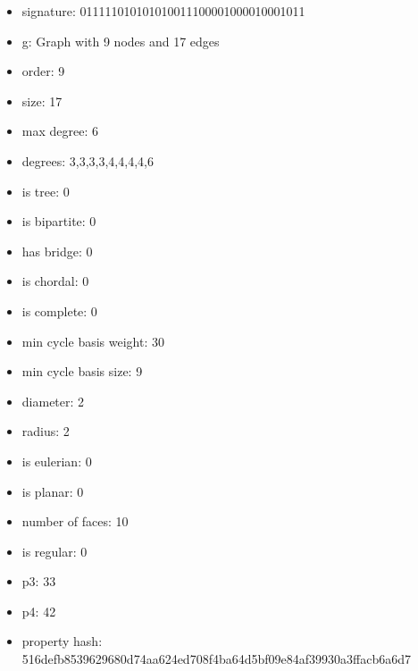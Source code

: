 \newpage
\begin{figure}
\end{figure}
\begin{itemize}
\item signature: 011111010101010011100001000010001011
\item g: Graph with 9 nodes and 17 edges
\item order: 9
\item size: 17
\item max degree: 6
\item degrees: 3,3,3,3,4,4,4,4,6
\item is tree: 0
\item is bipartite: 0
\item has bridge: 0
\item is chordal: 0
\item is complete: 0
\item min cycle basis weight: 30
\item min cycle basis size: 9
\item diameter: 2
\item radius: 2
\item is eulerian: 0
\item is planar: 0
\item number of faces: 10
\item is regular: 0
\item p3: 33
\item p4: 42
\item property hash: 516defb8539629680d74aa624ed708f4ba64d5bf09e84af39930a3ffacb6a6d7
\end{itemize}
